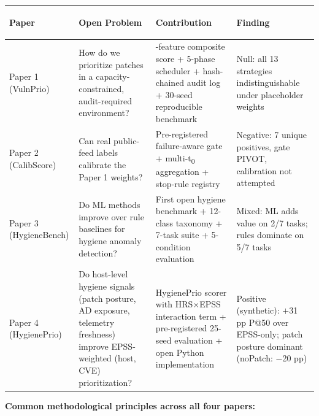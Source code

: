 \documentclass[12pt,letterpaper]{article}
\begin{document}
\vspace{1em}
\begin{center}
\begin{tabular}{>{\bfseries\raggedright\arraybackslash}p{3.5cm}
                >{\raggedright\arraybackslash}p{4.2cm}
                >{\raggedright\arraybackslash}p{4.0cm}
                >{\raggedright\arraybackslash}p{2.8cm}}
\toprule
\textbf{Paper} & \textbf{Open Problem} & \textbf{Contribution} & \textbf{Finding} \\
\midrule
Paper 1 \newline (VulnPrio) &
  How do we prioritize patches in a capacity-constrained, audit-required environment? &
  7-feature composite score + 5-phase scheduler + hash-chained audit log + 30-seed reproducible benchmark &
  Null: all 13 strategies indistinguishable under placeholder weights \\
\addlinespace
Paper 2 \newline (CalibScore) &
  Can real public-feed labels calibrate the Paper 1 weights? &
  Pre-registered failure-aware gate + multi-t\textsubscript{0} aggregation + stop-rule registry &
  Negative: 7 unique positives, gate PIVOT, calibration not attempted \\
\addlinespace
Paper 3 \newline (HygieneBench) &
  Do ML methods improve over rule baselines for hygiene anomaly detection? &
  First open hygiene benchmark + 12-class taxonomy + 7-task suite + 5-condition evaluation &
  Mixed: ML adds value on 2/7 tasks; rules dominate on 5/7 tasks \\
\addlinespace
Paper 4 \newline (HygienePrio) &
  Do host-level hygiene signals (patch posture, AD exposure, telemetry freshness) improve EPSS-weighted (host, CVE) prioritization? &
  HygienePrio scorer with HRS$\times$EPSS interaction term + pre-registered 25-seed evaluation + open Python implementation &
  Positive (synthetic): $+$31 pp P@50 over EPSS-only; patch posture dominant (noPatch: $-$20 pp) \\
\bottomrule
\end{tabular}
\end{center}

\vspace{1.5em}
\noindent\textbf{Common methodological principles across all four papers:}
\end{document}
